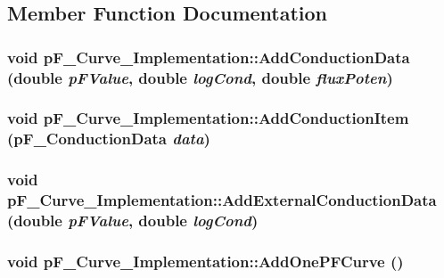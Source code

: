 \subsection{Member Function Documentation}
\hypertarget{classp_f___curve___implementation_a690f9e12e86f868727a05eccaedf770b}{
\subsubsection[{AddConductionData}]{\setlength{\rightskip}{0pt plus 5cm}void pF\_\-Curve\_\-Implementation::AddConductionData (double {\em pFValue}, \/  double {\em logCond}, \/  double {\em fluxPoten})}}
\label{classp_f___curve___implementation_a690f9e12e86f868727a05eccaedf770b}
\hypertarget{classp_f___curve___implementation_a9a54fe612db1222fae231f08c154b065}{
\subsubsection[{AddConductionItem}]{\setlength{\rightskip}{0pt plus 5cm}void pF\_\-Curve\_\-Implementation::AddConductionItem ({\bf pF\_\-ConductionData} {\em data})}}
\label{classp_f___curve___implementation_a9a54fe612db1222fae231f08c154b065}
\hypertarget{classp_f___curve___implementation_a735d822ebddc7ff3ef79549047882881}{
\subsubsection[{AddExternalConductionData}]{\setlength{\rightskip}{0pt plus 5cm}void pF\_\-Curve\_\-Implementation::AddExternalConductionData (double {\em pFValue}, \/  double {\em logCond})}}
\label{classp_f___curve___implementation_a735d822ebddc7ff3ef79549047882881}
\hypertarget{classp_f___curve___implementation_a574f0de0c3a61c10ad50c2818b824840}{
\subsubsection[{AddOnePFCurve}]{\setlength{\rightskip}{0pt plus 5cm}void pF\_\-Curve\_\-Implementation::AddOnePFCurve ()}}

